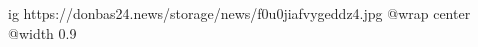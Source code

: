  
 
 
 
 

\ifcmt
  ig https://donbas24.news/storage/news/f0u0jiafvygeddz4.jpg
  @wrap center
  @width 0.9
\fi
